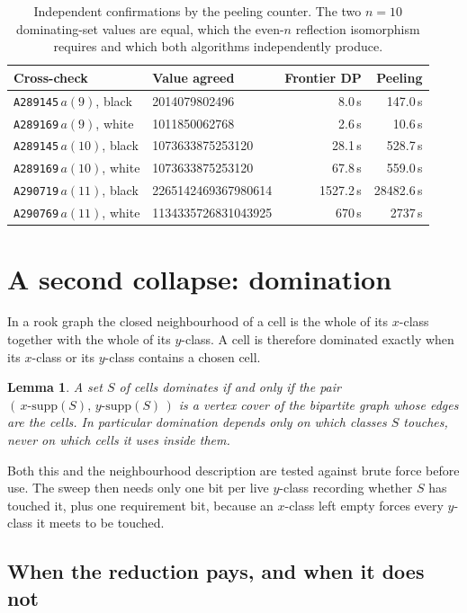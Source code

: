 \documentclass[11pt]{article}
\newtheorem{lemma}[theorem]{Lemma}
\theoremstyle{remark}
\newcommand{\seq}[1]{\texttt{#1}}
\begin{document}
\begin{table}[h]
\centering
\begin{tabular}{llrr}
\toprule
Cross-check & Value agreed & Frontier DP & Peeling \\
\midrule
\seq{A289145}\,$a(9)$, black  & 2014079802496    & 8.0\,s  & 147.0\,s \\
\seq{A289169}\,$a(9)$, white  & 1011850062768    & 2.6\,s  & 10.6\,s \\
\seq{A289145}\,$a(10)$, black & 1073633875253120 & 28.1\,s & 528.7\,s \\
\seq{A289169}\,$a(10)$, white & 1073633875253120 & 67.8\,s & 559.0\,s \\
\seq{A290719}\,$a(11)$, black & 2265142469367980614 & 1527.2\,s & 28482.6\,s \\
\seq{A290769}\,$a(11)$, white & 1134335726831043925 & 670\,s & 2737\,s \\
\bottomrule
\end{tabular}
\caption{Independent confirmations by the peeling counter. The two $n=10$
dominating-set values are equal, which the even-$n$ reflection isomorphism
requires and which both algorithms independently produce.}
\label{tab:crosscheck}
\end{table}

\section{A second collapse: domination}

In a rook graph the closed neighbourhood of a cell is the whole of its $x$-class
together with the whole of its $y$-class. A cell is therefore dominated exactly
when its $x$-class or its $y$-class contains a chosen cell.

\begin{lemma}\label{lem:domination}
A set $S$ of cells dominates if and only if the pair
$(\,x\text{-supp}(S),\, y\text{-supp}(S)\,)$ is a vertex cover of the bipartite
graph whose edges are the cells. In particular domination depends only on which
classes $S$ touches, never on which cells it uses inside them.
\end{lemma}

Both this and the neighbourhood description are tested against brute force before
use. The sweep then needs only one bit per live $y$-class recording whether $S$
has touched it, plus one requirement bit, because an $x$-class left empty forces
every $y$-class it meets to be touched.

\subsection{When the reduction pays, and when it does not}
\end{document}
